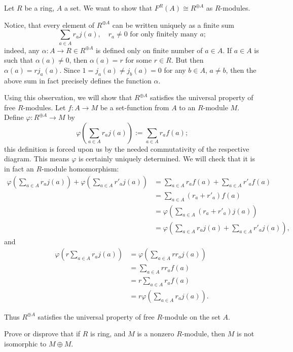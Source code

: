 \begin{solution}
	Let $R$ be a ring, $A$ a set. We want to show that $F^R(A) \cong R^{\oplus A}$ as $R$-modules.
	
	Notice, that every element of $R^{\oplus A}$ can be written uniquely as a finite sum
	\[
		\sum_{a \in A} r_a j(a), \quad r_a \neq 0 \text{ for only finitely many } a \text{;}
	\]
	indeed, any $\alpha: A \to R \in R^{\oplus A}$ is defined only on finite number of $a \in A$. If $a \in A$ is such that $\alpha(a) \neq 0$, then $\alpha(a) = r$ for some $r \in R$. But then $\alpha(a) = r j_a(a)$. Since $1 = j_a(a) \neq j_b(a) = 0$ for any $b \in A$, $a \neq b$, then the above sum in fact precisely defines the function $\alpha$.
	
	Using this observation, we will show that $R^{\oplus A}$ satisfies the universal property of free $R$-modules. Let $f: A \to M$ be a set-function from $A$ to an $R$-module $M$. Define $\varphi: R^{\oplus A} \to M$ by
	\[
		\varphi(\sum_{a \in A} r_a j(a)) := \sum_{a \in A} r_a f(a) \text{;}
	\]
	this definition is forced upon us by the needed commutativity of the respective diagram. This means $\varphi$ is certainly uniquely determined. We will check that it is in fact an $R$-module homomorphism:
	\begin{align*}
		\varphi(\sum_{a \in A} r_a j(a)) + \varphi(\sum_{a \in A} r'_a j(a)) &= \sum_{a \in A} r_a f(a) + \sum_{a \in A} r'_a f(a) \\
		&= \sum_{a \in A}(r_a + r'_a) f(a) \\
		&= \varphi(\sum_{a \in A}(r_a + r'_a) j(a)) \\
		&= \varphi(\sum_{a \in A}r_a j(a) + \sum_{a \in A}r'_a j(a)) \text{,}
	\end{align*}
	and
	\begin{align*}
		\varphi(r \sum_{a \in A} r_a j(a)) &= \varphi(\sum_{a \in A} r r_a j(a)) \\
		&= \sum_{a \in A} r r_a f(a) \\
		&= r \sum_{a \in A} r_a f(a) \\
		&= r \varphi(\sum_{a \in A} r_a j(a)) \text{.}
	\end{align*}

	Thus $R^{\oplus A}$ satisfies the universal property of free $R$-module on the set $A$.
\end{solution}

\begin{problem}
	Prove or disprove that if $R$ is ring, and $M$ is a nonzero $R$-module, then $M$ is not isomorphic to $M \oplus M$.
\end{problem}

